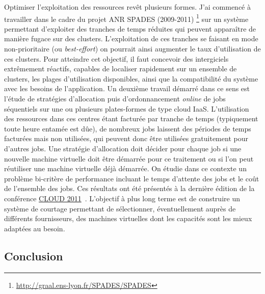 \documentclass[11pt]{article}
\begin{document}
Optimiser l'exploitation des ressources revêt plusieurs formes. J'ai commencé à
travailler dans le cadre du projet ANR SPADES (2009-2011)%
\footnote{\url{http://graal.ens-lyon.fr/SPADES/SPADES}}  
sur un système permettant d'exploiter des tranches de temps réduites qui 
peuvent apparaître de manière fugace sur des clusters. L'exploitation de ces 
tranches se faisant en mode non-prioritaire (ou \textit{best-effort}) on 
pourrait ainsi augmenter le taux d'utilisation de ces clusters. Pour atteindre 
cet objectif, il faut concevoir des intergiciels extrêmement réactifs, capables 
de localiser rapidement sur un ensemble de clusters, les plages d'utilisation 
disponibles, ainsi que la compatibilité du système avec les besoins de 
l'application. Un deuxième travail démarré dans ce sens est l'étude de 
stratégies d'allocation puis d'ordonnancement \textit{online} de jobs 
séquentiels sur une ou plusieurs plates-formes de type cloud IaaS. 
L'utilisation des ressources dans ces centres étant facturée par tranche de 
temps (typiquement toute heure entamée est dûe), de nombreux jobs laissent des 
périodes de temps facturées mais non utilisées, qui peuvent donc être utilisées 
gratuitement pour d'autres jobs. Une stratégie d'allocation doit décider pour 
chaque job si une nouvelle machine virtuelle doit être démarrée pour ce 
traitement ou si l'on peut réutiliser une machine virtuelle déjà démarrée. On 
étudie dans ce contexte un problème bi-critère de performance incluant le temps 
d'attente des jobs et le coût de l'ensemble des jobs. Ces résultats ont été 
présentés à la dernière édition de la conférence 
\href{http://www.thecloudcomputing.org/2011/}{CLOUD 2011}~\cite{icps-2011-225}.
L'objectif à plus long terme est de construire un système de courtage permettant 
de sélectionner, éventuellement auprès de différents fournisseurs, des machines 
virtuelles dont les capacités sont les mieux adaptées au besoin.


\subsection*{Conclusion}
\end{document}
